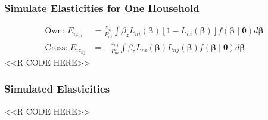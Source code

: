 \documentclass{beamer}
\begin{document}
\begin{frame}[fragile]\frametitle{Simulate Elasticities for One Household}
	\vspace{-3ex}
	\begin{align*}
    	\text{Own: } E_{iz_{ni}} & = \frac{z_{ni}}{P_{ni}} \int \beta_z L_{ni}(\bm{\beta}) [1 - L_{ni}(\bm{\beta})] f(\bm{\beta} \mid \bm{\theta}) d \bm{\beta} \\
    	\text{Cross: } E_{iz_{nj}} & = - \frac{z_{nj}}{P_{ni}} \int \beta_z L_{ni}(\bm{\beta}) L_{nj}(\bm{\beta}) f(\bm{\beta} \mid \bm{\theta}) d \bm{\beta}
    \end{align*}
    <<R CODE HERE>>
\end{frame}

\begin{frame}[fragile]\frametitle{Simulated Elasticities}
    <<R CODE HERE>>
\end{frame}
\end{document}
